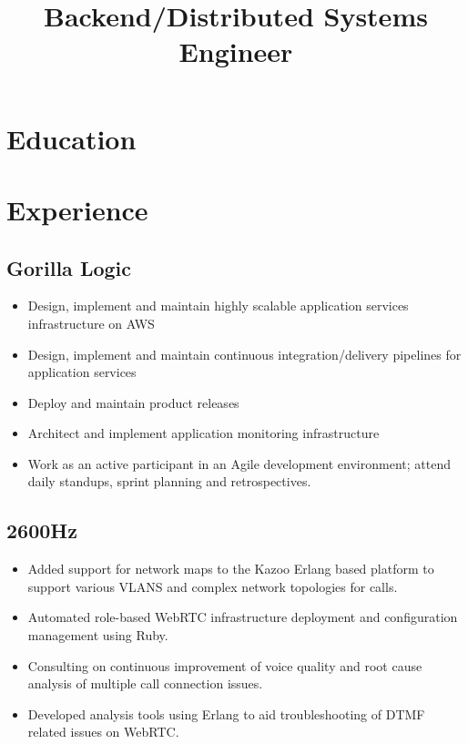 \documentclass[11pt,a4paper,sans]{moderncv}   %
\title{Backend/Distributed Systems Engineer}                          %
\begin{document}
\makecvtitle

\section{Education}

\section{Experience}
\subsection{Gorilla Logic}
\begin{itemize}
  \item Design, implement and maintain highly scalable application services infrastructure on AWS
  \item Design, implement and maintain continuous integration/delivery pipelines for application services
  \item Deploy and maintain product releases
  \item Architect and implement application monitoring infrastructure
  \item Work as an active participant in an Agile development environment; attend daily standups, sprint planning and retrospectives.
\end{itemize}
\subsection{2600Hz}
  \begin{itemize}
  \item Added support for network maps to the Kazoo Erlang based platform to support various VLANS and complex network topologies for calls.
  \item Automated role-based WebRTC infrastructure deployment and configuration management using Ruby.
  \item Consulting on continuous improvement of voice quality and root cause analysis of multiple call connection issues.
  \item Developed analysis tools using Erlang to aid troubleshooting of DTMF related issues on WebRTC.
  \end{itemize}
\end{document}
